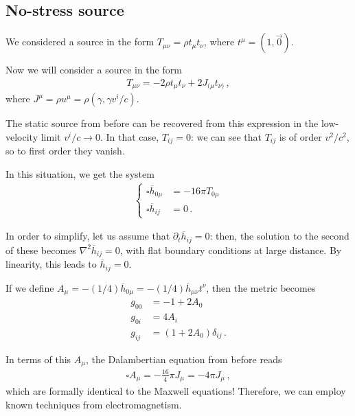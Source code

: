 \documentclass[main.tex]{subfiles}
\begin{document}
\subsection{No-stress source}


We considered a source in the form \(T_{\mu \nu } = \rho t_\mu t_\nu \), where \(t^{\mu } = (1, \vec{0})\). 

Now we will consider a source in the form 
%
\begin{align}
T_{\mu \nu } = - 2 \rho t_\mu t_\nu + 2 J_{(\mu } t_{\nu )}
\,,
\end{align}
%
where \(J^{\mu } = \rho u^{\mu } = \rho (\gamma , \gamma v^{i} / c)\). 


The static source from before can be recovered from this expression in the low-velocity limit \(v^{i} / c \to 0\). 
In that case, \(T_{ij} = 0\): we can see that \(T_{ij}\) is of order \(v^2 / c^2\), so to first order they vanish. 

In this situation, we get the system 
%
\begin{align}
\begin{cases}
    \square \overline{h}_{0 \mu } &= - 16 \pi T_{0 \mu } \\
    \square \overline{h}_{ij} &= 0
\,.
\end{cases}
\end{align}

In order to simplify, let us assume that \(\partial_{t} \overline{h}_{ij} = 0\): then, the solution to the second of these becomes \(\nabla^2 \overline{h}_{ij} = 0\), with flat boundary conditions at large distance. 
By linearity, this leads to \(\overline{h}_{ij} = 0\).

\begin{claim}
If we define \(A_{\mu } = - (1/4) \overline{h}_{0 \mu } = - (1/4) \overline{h}_{\mu \nu } t^{\nu }\), then the metric becomes 
%
\begin{align}
g_{00} &= - 1 + 2 A_0  \\
g_{0i} &= 4 A_i  \\
g_{ij} &= (1 + 2 A_0) \delta_{ij}
\,.
\end{align}
\end{claim}

In terms of this \(A_{\mu }\), the Dalambertian equation from before reads 
%
\begin{align}
\square A_{\mu } = - \frac{16}{4} \pi J_\mu = - 4 \pi J_\mu 
\,,
\end{align}
%
which are formally identical to the Maxwell equations! 
Therefore, we can employ known techniques from electromagnetism. 
\end{document}
